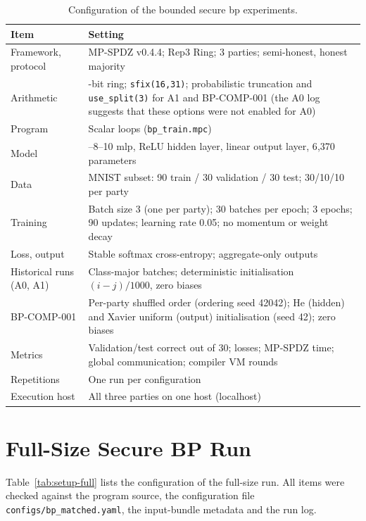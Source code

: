 \begin{table}[ht]
\centering
\small
\begin{tabular}{@{}>{\raggedright\arraybackslash}p{4.3cm}>{\raggedright\arraybackslash}p{9.6cm}@{}}
\toprule
Item & Setting \\
\midrule
Framework, protocol & MP-SPDZ v0.4.4; Rep3 Ring; 3 parties; semi-honest, honest majority \\
Arithmetic & 64-bit ring; \texttt{sfix(16,31)}; probabilistic truncation and \texttt{use\_split(3)} for A1 and BP-COMP-001 (the A0 log suggests that these options were not enabled for A0) \\
Program & Scalar loops (\texttt{bp\_train.mpc}) \\
Model & 784--8--10 \ac{mlp}, ReLU hidden layer, linear output layer, 6{,}370 parameters \\
Data & MNIST subset: 90 train / 30 validation / 30 test; 30/10/10 per party \\
Training & Batch size 3 (one per party); 30 batches per epoch; 3 epochs; 90 updates; learning rate 0.05; no momentum or weight decay \\
Loss, output & Stable softmax cross-entropy; aggregate-only outputs \\
Historical runs (A0, A1) & Class-major batches; deterministic initialisation $(i-j)/1000$, zero biases \\
BP-COMP-001 & Per-party shuffled order (ordering seed 42042); He (hidden) and Xavier uniform (output) initialisation (seed 42); zero biases \\
Metrics & Validation/test correct out of 30; losses; MP-SPDZ time; global communication; compiler VM rounds \\
Repetitions & One run per configuration \\
Execution host & All three parties on one host (localhost) \\
\bottomrule
\end{tabular}
\caption{Configuration of the bounded secure \ac{bp} experiments.}
\label{tab:setup-secure}
\end{table}

\section{Full-Size Secure BP Run}\label{sec:setup-full}
Table~\ref{tab:setup-full} lists the configuration of the full-size run. All items were checked against the program source, the configuration file \texttt{configs/\allowbreak bp\_\allowbreak matched.yaml}, the input-bundle metadata and the run log.

